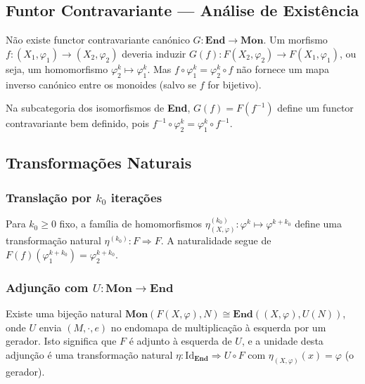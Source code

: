 \subsection{Funtor Contravariante --- Análise de Existência}

\begin{proposition}
Não existe functor contravariante canónico $G: \mathbf{End} \to \mathbf{Mon}$. Um morfismo $f: (X_1, \varphi_1) \to (X_2, \varphi_2)$ deveria induzir $G(f): F(X_2, \varphi_2) \to F(X_1, \varphi_1)$, ou seja, um homomorfismo $\varphi_2^k \mapsto \varphi_1^k$. Mas $f \circ \varphi_1^k = \varphi_2^k \circ f$ não fornece um mapa inverso canónico entre os monoides (salvo se $f$ for bijetivo).
\end{proposition}

\begin{remark}
Na subcategoria dos isomorfismos de \textbf{End}, $G(f) = F(f^{-1})$ define um functor contravariante bem definido, pois $f^{-1} \circ \varphi_2^k = \varphi_1^k \circ f^{-1}$.
\end{remark}

\subsection{Transformações Naturais}

\subsubsection{Translação por $k_0$ iterações}

Para $k_0 \geq 0$ fixo, a família de homomorfismos $\eta^{(k_0)}_{(X,\varphi)}: \varphi^k \mapsto \varphi^{k+k_0}$ define uma transformação natural $\eta^{(k_0)}: F \Rightarrow F$. A naturalidade segue de $F(f)(\varphi_1^{k+k_0}) = \varphi_2^{k+k_0}$.

\subsubsection{Adjunção com $U: \mathbf{Mon} \to \mathbf{End}$}

Existe uma bijeção natural $\mathbf{Mon}(F(X,\varphi), N) \cong \mathbf{End}((X,\varphi), U(N))$, onde $U$ envia $(M,\cdot,e)$ no endomapa de multiplicação à esquerda por um gerador. Isto significa que $F$ é adjunto à esquerda de $U$, e a unidade desta adjunção é uma transformação natural $\eta: \mathrm{Id}_{\mathbf{End}} \Rightarrow U \circ F$ com $\eta_{(X,\varphi)}(x) = \varphi$ (o gerador).

